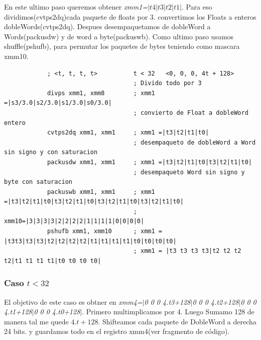 En este ultimo paso queremos obtener \emph{xmm1=$|t4|t3|t2|t1|$}. Para eso dividimos(cvtps2dq)cada paquete de floats por 3.
convertimos los Floats a enteros dobleWords(cvtps2dq).
Despues desempaquetamos de dobleWord a Words(packusdw) y de word a byte(packuswb).
Como ultimo paso usamos shuffle(pshufb), para permutar los paquetes de bytes teniendo como mascara xmm10. 
\begin{codesnippet}
\begin{verbatim}
            ; <t, t, t, t>          t < 32   <0, 0, 0, 4t + 128>
                                    ; Divido todo por 3
            divps xmm1, xmm8        ; xmm1 =|s3/3.0|s2/3.0|s1/3.0|s0/3.0| 
                                    ; convierto de Float a dobleWord entero
            cvtps2dq xmm1, xmm1     ; xmm1 =|t3|t2|t1|t0|
                                    ; desempaqueto de dobleWord a Word sin signo y con saturacion
            packusdw xmm1, xmm1     ; xmm1 =|t3|t2|t1|t0|t3|t2|t1|t0|
                                    ; desempaqueto Word sin signo y  byte con saturacion
            packuswb xmm1, xmm1     ; xmm1 =|t3|t2|t1|t0|t3|t2|t1|t0|t3|t2|t1|t0|t3|t2|t1|t0| 
                                    ; xmm10=|3|3|3|3|2|2|2|2|1|1|1|1|0|0|0|0|
            pshufb xmm1, xmm10      ; xmm1 = |t3t3|t3|t3|t2|t2|t2|t2|t1|t1|t1|t1|t0|t0|t0|t0|
                                    ; xmm1 = |t3 t3 t3 t3|t2 t2 t2 t2|t1 t1 t1 t1|t0 t0 t0 t0|

\end{verbatim}
\end{codesnippet}

\subsubsection*{Caso $t<32$}
El objetivo de este caso es obtner en \emph{xmm4=$|$0 0 0 4.t3+128$|$0 0 0 4.t2+128$|$0 0 0 4.t1+128$|$0 0 0 4.t0+128$|$}.
Primero multimplicamos por 4.
Luego Sumamo 128 de manera tal me quede $4.t+128$. 
Shifteamos cada paquete de DobleWord a derecha 24 bits.
y guardamos todo en el registro xmm4(ver fragmento de código).

